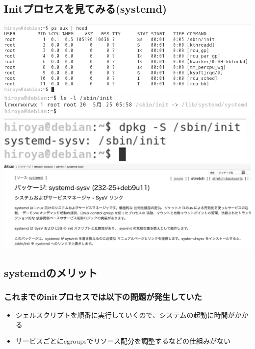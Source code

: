 \documentclass[mingoth,a4paper]{jsarticle}
\begin{document}
\subsection{Initプロセスを見てみる(systemd)}
\begin{flushleft}
\includegraphics[keepaspectratio,width=0.6\hsize]{image201905-kansai/systemd01_gray.png}
 \\
\includegraphics[keepaspectratio,width=0.6\hsize]{image201905-kansai/systemd02_gray.png}
 \\
\includegraphics[keepaspectratio,width=0.4\hsize]{image201905-kansai/systemd03_gray.png}
 \\
\includegraphics[keepaspectratio,width=0.7\hsize]{image201905-kansai/systemd04_gray.png}
\end{flushleft}

\subsection{systemdのメリット}
\subsubsection{これまでのinitプロセスでは以下の問題が発生していた}

\begin{itemize}
 \item シェルスクリプトを順番に実行していくので、システムの起動に時間がかかる
 \item サービスごとにcgroupsでリソース配分を調整するなどの仕組みがない
\end{itemize}
\end{document}
